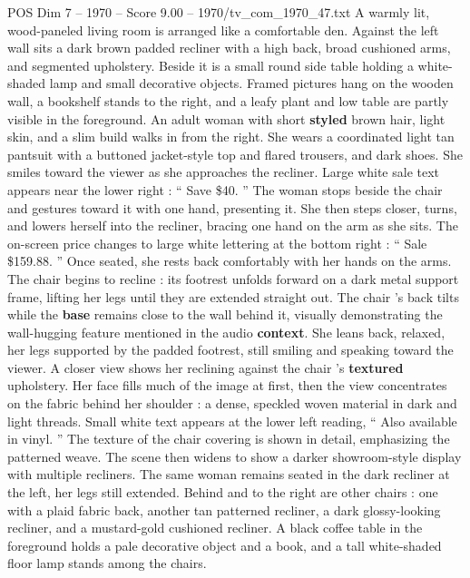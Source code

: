 \begin{textsample}{POS Dim 7 – 1970 – Score 9.00 – 1970/tv\_com\_1970\_47.txt}  \label{ex:f7_pos_032}
A warmly lit, wood-paneled living room is arranged like a comfortable den.
Against the left wall sits a dark brown padded recliner with a high back, broad cushioned arms, and segmented upholstery.
Beside it is a small round side table holding a white-shaded lamp and small decorative objects.
Framed pictures hang on the wooden wall, a bookshelf stands to the right, and a leafy plant and low table are partly visible in the foreground.
An adult woman with short \textbf{styled} brown hair, light skin, and a slim build walks in from the right.
She wears a coordinated light tan pantsuit with a buttoned jacket-style top and flared trousers, and dark shoes.
She smiles toward the viewer as she approaches the recliner.
Large white sale text appears near the lower right : “ Save \$40. ” The woman stops beside the chair and gestures toward it with one hand, presenting it.
She then steps closer, turns, and lowers herself into the recliner, bracing one hand on the arm as she sits.
The on-screen price changes to large white lettering at the bottom right : “ Sale \$159.88. ” Once seated, she rests back comfortably with her hands on the arms.
The chair begins to recline : its footrest unfolds forward on a dark metal support frame, lifting her legs until they are extended straight out.
The chair ’s back tilts while the \textbf{base} remains close to the wall behind it, visually demonstrating the wall-hugging feature mentioned in the audio \textbf{context}.
She leans back, relaxed, her legs supported by the padded footrest, still smiling and speaking toward the viewer.
A closer view shows her reclining against the chair ’s \textbf{textured} upholstery.
Her face fills much of the image at first, then the view concentrates on the fabric behind her shoulder : a dense, speckled woven material in dark and light threads.
Small white text appears at the lower left reading, “ Also available in vinyl. ” The texture of the chair covering is shown in detail, emphasizing the patterned weave.
The scene then widens to show a darker showroom-style display with multiple recliners.
The same woman remains seated in the dark recliner at the left, her legs still extended.
Behind and to the right are other chairs : one with a plaid fabric back, another tan patterned recliner, a dark glossy-looking recliner, and a mustard-gold cushioned recliner.
A black coffee table in the foreground holds a pale decorative object and a book, and a tall white-shaded floor lamp stands among the chairs.

\end{textsample}
